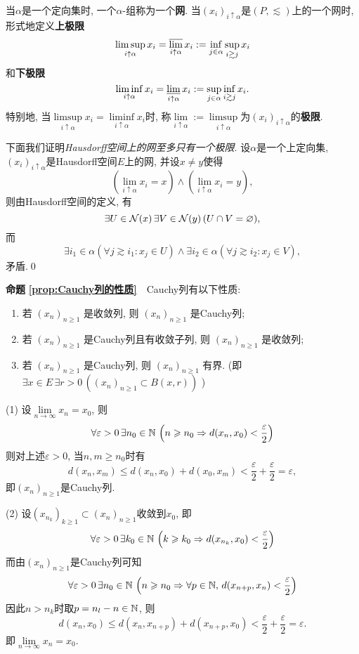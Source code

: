 \begin{appendix}
\begin{Definition}
		当$ \alpha $是一个定向集时, 一个$ \alpha $-组称为一个\textbf{网}. 当$ (x_i)_{i\uparrow\alpha} $是$ (P,\lesssim) $上的一个网时, 形式地定义\textbf{上极限}
		\[
		\limsup_{i\uparrow\alpha}x_i=\varlimsup_{i\uparrow\alpha}x_i:=\inf_{j\in\alpha}\sup_{i\gtrsim j}x_i
		\]
		和\textbf{下极限}
		\[
		\liminf_{i\uparrow\alpha}x_i=\varliminf_{i\uparrow\alpha}x_i:=\sup_{j\in\alpha}\inf_{i\gtrsim j}x_i.
		\]
		特别地, 当$ \limsup\limits_{i\uparrow\alpha}x_i=\liminf\limits_{i\uparrow\alpha}x_i $时, 称$ \lim\limits_{i\uparrow\alpha}:=\limsup\limits_{i\uparrow\alpha} $为$ (x_i)_{i\uparrow\alpha} $的\textbf{极限}.
	\end{Definition}
	\begin{Proof}
	下面我们证明\textsl{Hausdorff空间上的网至多只有一个极限}. 设$ \alpha $是一个上定向集, $ (x_i)_{i\uparrow\alpha} $是Hausdorff空间$ E $上的网, 并设$ x\ne y $使得
	\[
	\left(\lim_{i\uparrow\alpha}x_i=x\right)\land\left(\lim_{i\uparrow\alpha}x_i=y\right),
	\]
	则由Hausdorff空间的定义, 有
	\[
	\exists U\in\mathcal{N}(x)\,\exists V\in\mathcal{N}({y})\,(U\cap V=\varnothing),
	\]
	而
	\[
	\exists i_1\in\alpha( \forall j\gtrsim i_1 : x_j\in U )\land\exists i_2\in\alpha( \forall j\gtrsim i_2 : x_j\in V ),
	\]
	矛盾.\qed
	\end{Proof}
	
	\textbf{命题\,\,\ref{prop:Cauchy列的性质}}\ \ Cauchy列有以下性质:
		\begin{enumerate}[(1)]
	    	\item 若 $ (x_{n})_{n\geqslant1} $ 是收敛列, 则 $ (x_{n})_{n\geqslant1} $ 是Cauchy列;
	        \item 若 $ (x_{n})_{n\geqslant1} $ 是Cauchy列且有收敛子列, 则 $ (x_{n})_{n\geqslant1} $ 是收敛列;
	        \item 若 $ (x_{n})_{n\geqslant1} $ 是Cauchy列, 则 $ (x_{n})_{n\geqslant1} $ 有界. (即 $ \exists x\in E\,\exists r>0\,((x_{n})_{n\geqslant1} \subset B(x, r)) $ )
	   \end{enumerate}
	\begin{Proof}
	(1) 设$ \lim\limits_{n\to\infty}x_n=x_0 $, 则
	\[
	\forall\varepsilon>0\,\exists n_0\in\mathbb{N}\,\left(n\geqslant n_0\Rightarrow d(x_n,x_0)<\frac{\varepsilon}{2}\right)
	\]
	则对上述$ \varepsilon>0 $, 当$ n,m\geqslant n_0 $时有
	\[
	d(x_n,x_m)\leqslant d(x_n,x_0)+d(x_0,x_m)<\frac{\varepsilon}{2}+\frac{\varepsilon}{2}=\varepsilon,
	\]
	即$ (x_n)_{n\geqslant 1} $是Cauchy列.
	
	(2) 设$ (x_{n_k})_{k\geqslant 1}\subset(x_n)_{n\geqslant 1} $收敛到$ x_0 $, 即
	\[
	\forall\varepsilon>0\,\exists k_0\in\mathbb{N}\,\left(k\geqslant k_0\Rightarrow d(x_{n_k},x_0)<\frac{\varepsilon}{2}\right)
	\]
	而由$ (x_n)_{n\geqslant 1} $是Cauchy列可知
	\[
	\forall\varepsilon>0\,\exists n_0\in\mathbb{N}\,\left( n\geqslant n_0\Rightarrow\forall p\in\mathbb{N},\,d(x_{n+p},x_n)<\frac{\varepsilon}{2} \right)
	\]
	因此$ n>n_k $时取$ p=n_l-n\in\mathbb{N} $, 则
	\[
	d(x_n,x_0)\leqslant d(x_n,x_{n+p})+d(x_{n+p},x_0)<\frac{\varepsilon}{2}+\frac{\varepsilon}{2}=\varepsilon.
	\]
	即$ \lim\limits_{n\to\infty}x_n=x_0 $.
	

\end{Proof}
\end{appendix}
